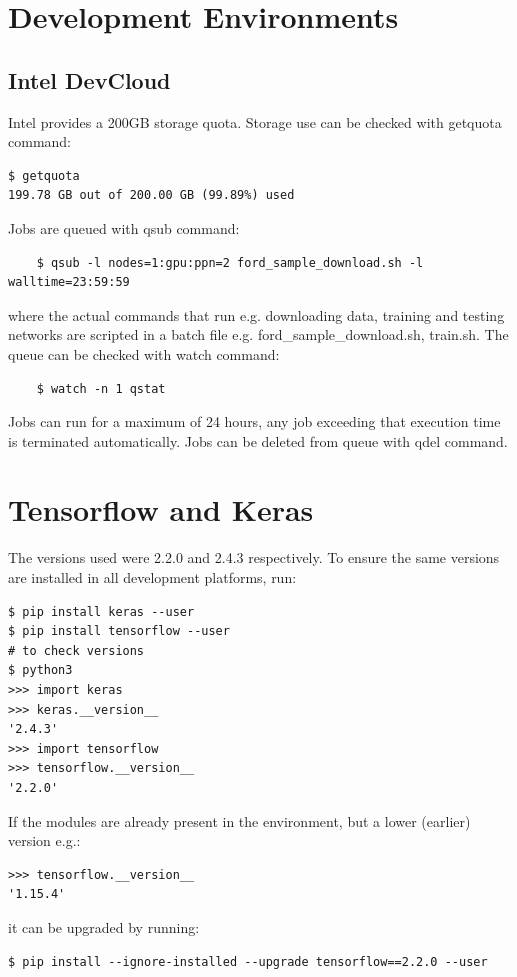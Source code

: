 \section{Development Environments}

\subsection{Intel DevCloud}

Intel provides a 200GB storage quota. Storage use can be checked with getquota command:
\begin{verbatim}
$ getquota
199.78 GB out of 200.00 GB (99.89%) used   
\end{verbatim}
Jobs are queued with qsub command:
\begin{verbatim}
    $ qsub -l nodes=1:gpu:ppn=2 ford_sample_download.sh -l walltime=23:59:59
\end{verbatim}
where the actual commands that run e.g. downloading data, training and testing networks are scripted in a batch file e.g. ford\_sample\_download.sh, train.sh.   
The queue can be checked with watch command:
\begin{verbatim}
    $ watch -n 1 qstat
\end{verbatim}
Jobs can run for a maximum of 24 hours, any job exceeding that execution time is terminated automatically. Jobs can be deleted from queue with qdel command.

\section{Tensorflow and Keras}
\label{methods:tensorflow-keras}
The versions used were 2.2.0 and 2.4.3 respectively. To ensure the same versions are installed in all development platforms, run:
\begin{verbatim}
$ pip install keras --user
$ pip install tensorflow --user
# to check versions
$ python3
>>> import keras
>>> keras.__version__
'2.4.3'
>>> import tensorflow
>>> tensorflow.__version__
'2.2.0'
\end{verbatim}
If the modules are already present in the environment, but a lower (earlier) version e.g.:
\begin{verbatim}
>>> tensorflow.__version__
'1.15.4'    
\end{verbatim}
it can be upgraded by running:
\begin{verbatim}
$ pip install --ignore-installed --upgrade tensorflow==2.2.0 --user
\end{verbatim}


